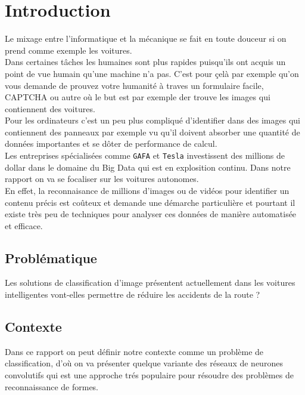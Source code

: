 \documentclass[french,a4paper,11pt,oneside]{article}
\begin{document}
	\section{Introduction}{
		Le mixage entre l'informatique et la mécanique se fait en toute douceur si on prend comme exemple les voitures.\\
		Dans certaines tâches les humaines sont plus rapides puisqu'ils ont acquis un point de vue humain qu'une machine n'a pas. C'est pour çelà par exemple qu'on vous demande de prouvez votre humanité à traves un formulaire facile, CAPTCHA ou autre où le but est par exemple der trouve les images qui contiennent des voitures.\\
		Pour les ordinateurs c'est un peu plus compliqué d'identifier dans des images qui contiennent des panneaux par exemple vu qu'il doivent absorber une quantité de données importantes et se dôter de performance de calcul.\\
		Les entreprises spécialisées comme \texttt{GAFA} et \texttt{Tesla} investissent des millions de dollar dans le domaine du Big Data qui est en explosition continu. Dans notre rapport on va se focaliser sur les voitures autonomes.\\
		En effet, la reconnaisance de millions d'images ou de vidéos pour identifier un contenu précis est coûteux et demande une démarche particulière et pourtant il existe très peu de techniques pour analyser ces données de manière automatisée et efficace.\\
		\subsection{Problématique}{
			Les solutions de classification d'image présentent actuellement dans les voitures intelligentes vont-elles permettre de réduire les accidents de la route ?
		}
		 \subsection{Contexte}{
			Dans ce rapport on peut définir notre contexte comme un problème de classification, d'où on va présenter quelque variante des réseaux de neurones convolutifs qui est une approche trés populaire pour résoudre des problèmes de reconnaissance de formes. 
	 	 
 	    }
	}
	
\end{document}
